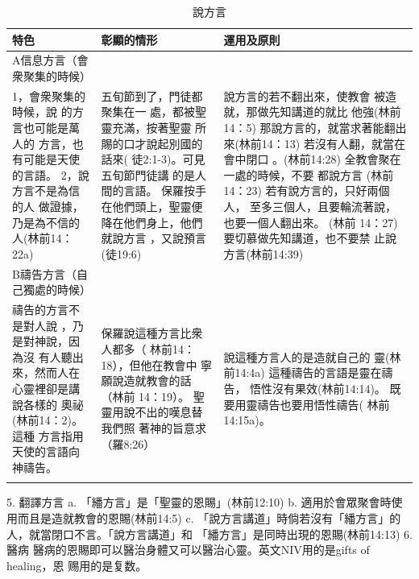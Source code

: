 \begin{table}[htbp]
  \centering
    \begin{tabular}{p{15.145em}|p{15.785em}|p{16.5em}}    \toprule
\multicolumn{1}{p{15.215em}|}{\textbf{特色}} & \multicolumn{1}{p{15.215em}|}{\textbf{彰顯的情形}} &\multicolumn{1}{p{15em}|}{\textbf{運用及原則}} \\
    \midrule
  
A信息方言（會衆聚集的時候）&& \\    \midrule
1，會衆聚集的時候，說
的方言也可能是萬人的
方言，也有可能是天使
的言語。
2，說方言不是為信的人
做證據，乃是為不信的
人(林前14：22a)&

五旬節到了，門徒都聚集在一
處，都被聖靈充滿，按著聖靈
所賜的口才說起別國的話來(
徒2:1-3)。可見五旬節門徒講
的是人間的言語。
保羅按手在他們頭上，聖靈便
降在他們身上，他們就說方言
，又說預言(徒19:6)&

說方言的若不翻出來，使教會
被造就，那做先知講道的就比
他強(林前14：5)
那說方言的，就當求著能翻出
來(林前14：13)
若沒有人翻，就當在會中閉口
。(林前14:28)
全教會聚在一處的時候，不要
都說方言 (林前14：23)
若有說方言的，只好兩個人，
至多三個人，且要輪流著說，
也要一個人翻出來。 (林前
14：27)
要切慕做先知講道，也不要禁
止說方言(林前14:39)\\    \midrule

B禱告方言（自己獨處的時候）&&\\    \midrule
禱告的方言不是對人說
，乃是對神說，因為沒
有人聽出來，然而人在
心靈裡卻是講說各樣的
奧祕(林前14：2)。這種
方言指用天使的言語向
神禱告。&

保羅說這種方言比衆人都多（
林前14：18），但他在教會中
寧願說造就教會的話（林前
14：19）。
聖靈用說不出的嘆息替我們照
著神的旨意求（羅8:26）&

說這種方言人的是造就自己的
靈(林前14:4a)
這種禱告的言語是靈在禱告，
悟性沒有果效(林前14:14)。
既要用靈禱告也要用悟性禱告(
林前14:15a)。\\    \midrule
\\    \bottomrule
    \end{tabular}%
     \caption{說方言}
  \label{tab:addlabel}%
\end{table}%




5. 翻譯方言
a. 「繙方言」是「聖靈的恩賜」(林前12:10)
b. 適用於會眾聚會時使用而且是造就教會的恩賜(林前14:5)
c. 「說方言講道」時倘若沒有「繙方言」的人，就當閉口不言。「說方言講道」和
「繙方言」是同時出現的恩賜(林前14:13)
6. 醫病
醫病的恩賜即可以醫治身體又可以醫治心靈。英文NIV用的是gifts of healing，恩
赐用的是复数。


